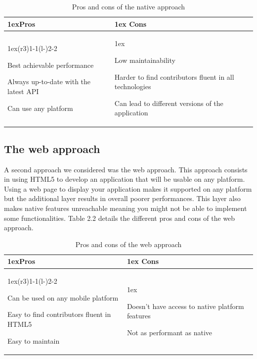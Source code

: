 \documentclass{eplmastersthesis}
\begin{document}
\begin{table}[H]
\begin{tabularx}{\linewidth}{>{\parskip1ex}X@{\kern4\tabcolsep}>{\parskip1ex}X}
\toprule
\hfil\bfseries Pros
&
\hfil\bfseries Cons
\\\cmidrule(r{3\tabcolsep}){1-1}\cmidrule(l{-\tabcolsep}){2-2}

Best achievable performance\par
Always up-to-date with the latest API\par
Can use any platform\par

&

Low maintainability\par
Harder to find contributors fluent in all technologies\par
Can lead to different versions of the application\par


\\\bottomrule
\end{tabularx}
\caption{Pros and cons of the native approach}
\end{table}

\subsection{The web approach}
A second approach we considered was the web approach. This approach consists in using HTML5 to develop an application that will be usable on any platform. \\

Using a web page to display your application makes it supported on any platform but the additional layer results in overall poorer performances. This layer also makes native features unreachable meaning you might not be able to implement some functionalities. Table 2.2 details the different pros and cons of the web approach.\\


\begin{table}[H]
\begin{tabularx}{\linewidth}{>{\parskip1ex}X@{\kern4\tabcolsep}>{\parskip1ex}X}
\toprule
\hfil\bfseries Pros
&
\hfil\bfseries Cons
\\\cmidrule(r{3\tabcolsep}){1-1}\cmidrule(l{-\tabcolsep}){2-2}

Can be used on any mobile platform\par
Easy to find contributors fluent in HTML5\par
Easy to maintain\par

&

Doesn't have access to native platform features\par
Not as performant as native\par



\\\bottomrule
\end{tabularx}
\caption{Pros and cons of the web approach}
\end{table}
\end{document}
